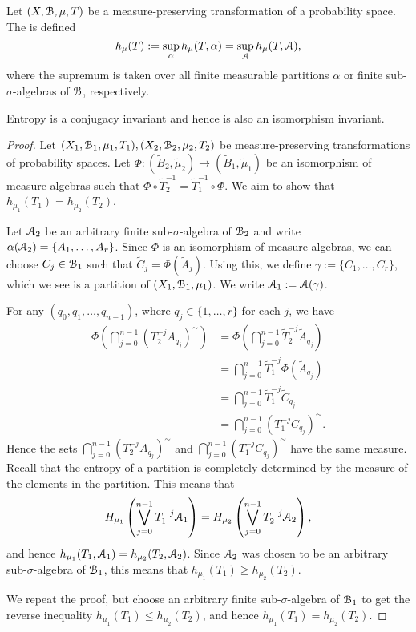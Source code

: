 \begin{definition}
	Let $(X, \mathcal{B}, \mu, T)$ be a measure-preserving transformation of a probability space. The  is defined
	\[
		h_\mu(T) := \sup_{\alpha}{h_\mu(T, \alpha)} = \sup_{\mathcal{A}}{h_\mu(T, \mathcal{A})},
	\]
	where the supremum is taken over all finite measurable partitions $\alpha$ or finite sub-$\sigma$-algebras of $\mathcal{B}$, respectively.
\end{definition}

\begin{theorem}
	Entropy is a conjugacy invariant and hence is also an isomorphism invariant.
	\begin{proof}
		Let $(X_1, \mathcal{B}_1, \mu_1, T_1), (X_2, \mathcal{B}_2, \mu_2, T_2)$ be measure-preserving transformations of probability spaces. Let $\Phi : (\tilde{B}_2, \tilde{\mu}_2) \to (\tilde{B}_1, \tilde{\mu}_1)$ be an isomorphism of measure algebras such that $\Phi \circ \tilde{T}_2^{-1} = \tilde{T}_1^{-1} \circ \Phi$. We aim to show that $h_{\mu_1}(T_1) = h_{\mu_2}(T_2)$.
		
		Let $\mathcal{A}_2$ be an arbitrary finite sub-$\sigma$-algebra of $\mathcal{B}_2$ and write $\alpha(\mathcal{A}_2) = \{A_1, \dots, A_r\}$. Since $\Phi$ is an isomorphism of measure algebras, we can choose $C_j \in \mathcal{B}_1$ such that $\tilde{C}_j = \Phi(\tilde{A}_j)$. Using this, we define $\gamma := \{C_1, \dots, C_r\}$, which we see is a partition of $(X_1, \mathcal{B}_1, \mu_1)$. We write $\mathcal{A}_1 := \mathcal{A}(\gamma)$.
		
		For any $(q_0, q_1, \dots, q_{n - 1})$, where $q_j \in \{1, \dots, r\}$ for each $j$, we have
		\begin{align*}
			\Phi\left(\bigcap_{j = 0}^{n - 1}{(T_2^{-j} A_{q_j})^\sim}\right) &= \Phi\left(\bigcap_{j = 0}^{n - 1}{\tilde{T}_2^{-j} \tilde{A}_{q_j}}\right) \\
				&= \bigcap_{j = 0}^{n - 1}{\tilde{T}_1^{-j} \Phi(\tilde{A}_{q_j})} \\
				&= \bigcap_{j = 0}^{n - 1}{\tilde{T}_1^{-j} \tilde{C}_{q_j}} \\
				&= \bigcap_{j = 0}^{n - 1}{(T_1^{-j} C_{q_j})^\sim}.
		\end{align*}
		Hence the sets $\bigcap_{j = 0}^{n - 1}{(T_2^{-j} A_{q_j})^\sim}$ and $\bigcap_{j = 0}^{n - 1}{(T_1^{-j} C_{q_j})^\sim}$ have the same measure. Recall that the entropy of a partition is completely determined by the measure of the elements in the partition. This means that
		\[
			H_{\mu_1}\left(\bigvee_{j = 0}^{n - 1}{T_1^{-j}{\mathcal{A}_1}}\right) = H_{\mu_2}\left(\bigvee_{j = 0}^{n - 1}{T_2^{-j}{\mathcal{A}_2}}\right),
		\]
		and hence $h_{\mu_1}(T_1, \mathcal{A}_1) = h_{\mu_2}(T_2, \mathcal{A}_2)$. Since $\mathcal{A}_2$ was chosen to be an arbitrary sub-$\sigma$-algebra of $\mathcal{B}_1$, this means that $h_{\mu_1}(T_1) \geq h_{\mu_2}(T_2)$.
		
		We repeat the proof, but choose an arbitrary finite sub-$\sigma$-algebra of $\mathcal{B}_1$ to get the reverse inequality $h_{\mu_1}(T_1) \leq h_{\mu_2}(T_2)$, and hence $h_{\mu_1}(T_1) = h_{\mu_2}(T_2)$.
	\end{proof}
\end{theorem}

